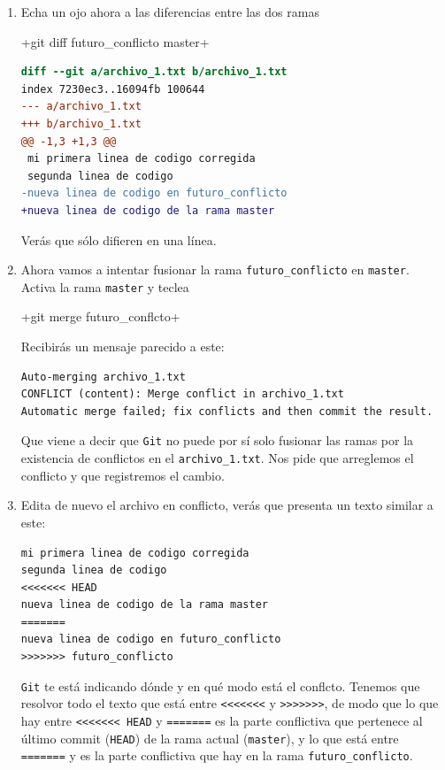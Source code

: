 \documentclass[a5paper, oneside,10pt]{article}
\begin{document}
\begin{enumerate}
     \item Echa un ojo ahora a las diferencias entre las dos ramas
     
     \cverb+git diff futuro_conflicto master+

    \begin{lstlisting}[language=diff]
diff --git a/archivo_1.txt b/archivo_1.txt
index 7230ec3..16094fb 100644
--- a/archivo_1.txt
+++ b/archivo_1.txt
@@ -1,3 +1,3 @@
 mi primera linea de codigo corregida
 segunda linea de codigo
-nueva linea de codigo en futuro_conflicto
+nueva linea de codigo de la rama master
    \end{lstlisting}
    Verás que sólo difieren en una línea.
    
    \item Ahora vamos a intentar fusionar la rama \verb+futuro_conflicto+ en \verb+master+. Activa la rama \verb+master+ y teclea
    
    \cverb+git merge futuro_conflcto+
    
    Recibirás un mensaje parecido a este:
    \begin{lstlisting}[style=custom]
Auto-merging archivo_1.txt
CONFLICT (content): Merge conflict in archivo_1.txt
Automatic merge failed; fix conflicts and then commit the result.
    \end{lstlisting}
    Que viene a decir que \verb+Git+ no puede por sí solo fusionar las ramas por la existencia de conflictos en el \verb+archivo_1.txt+. Nos pide que arreglemos el conflicto y que registremos el cambio.
    
    \item Edita de nuevo el archivo en conflicto, verás que presenta un texto similar a este:
    
    \begin{lstlisting}[style=custom]
mi primera linea de codigo corregida
segunda linea de codigo
<<<<<<< HEAD
nueva linea de codigo de la rama master
=======
nueva linea de codigo en futuro_conflicto
>>>>>>> futuro_conflicto
    \end{lstlisting}
    
    \verb+Git+ te está indicando dónde y en qué modo está el conflcto. Tenemos que resolvor todo el texto que está entre \verb+<<<<<<<+ y \verb+>>>>>>>+, de modo que lo que hay entre \verb+<<<<<<< HEAD+ y \verb+=======+ es la parte conflictiva que pertenece al último commit (\verb+HEAD+) de la rama actual (\verb+master+), y lo que está entre \verb+=======+ y es la parte conflictiva que hay en la rama \verb+futuro_conflicto+.
    

\end{enumerate}
\end{document}
